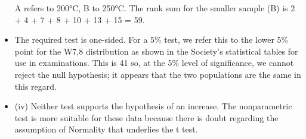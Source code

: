 \documentclass[a4paper,12pt]{article}
\begin{document}
\begin{itemize}
\begin{center}
\begin{tabular}{c|c|c}
\end{tabular}
\end{center}

A refers to 200°C, B to 250°C.
The rank sum for the smaller sample (B) is 2 + 4 + 7 + 8 + 10 + 13 + 15 = 59.
\item The required test is one-sided. For a 5\% test, we refer this to the lower 5\% point for the W7,8 distribution as shown in the Society's statistical tables for use in examinations. This is 41 so, at the 5\% level of significance, we cannot reject the null hypothesis; it appears that the two populations are the same in this regard.
\item (iv) Neither test supports the hypothesis of an increase. The nonparametric test is more suitable for these data because there is doubt regarding the assumption of Normality that underlies the t test.
 \end{itemize}
 
\end{document}
